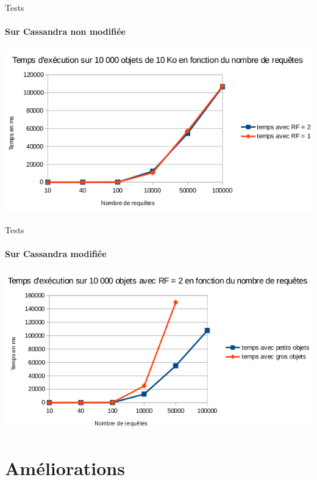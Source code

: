 \documentclass{beamer}
\begin{document}
\begin{frame}{Tests}
\framesubtitle{Sur Cassandra non modifiée}
\centering
    \includegraphics[scale=0.6]{cassandra_non_modif-RF-PO}
\end{frame}


\begin{frame}{Tests}
\framesubtitle{Sur Cassandra modifiée}
\centering
    \includegraphics[scale=0.6]{PAF-TailleO-RF2}
\end{frame}


\section{Améliorations}
\end{document}
